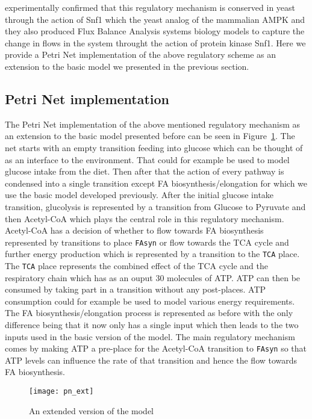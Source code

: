 \citet{nielsen2009systems} experimentally confirmed that
this regulatory mechanism is conserved in yeast through the action of
Snf1 which the yeast analog of the mammalian AMPK and they also
produced Flux Balance Analysis systems biology models to capture the
change in flows in the system throught the action of protein kinase
Snf1. Here we provide a Petri Net implementation of the above
regulatory scheme as an extension to the basic model we presented
in the previous section.

\subsection{Petri Net implementation}
The Petri Net implementation of the above mentioned regulatory
mechanism as an extension to the basic model presented before can be
seen in Figure~\ref{fig:pn_ext}. The net starts with an empty
transition feeding into glucose which can be thought of as an
interface to the environment. That could for example be used to model
glucose intake from the diet. Then after that the action of every pathway
is condensed into a single transition except FA
biosynthesis/elongation for which we use the basic model developed
previously. After the initial glucose intake transition, glucolysis is
represented by a transition from Glucose to Pyruvate and then
Acetyl-CoA which plays the central role in this regulatory
mechanism. Acetyl-CoA has a decision of whether to flow towards FA
biosynthesis represented by transitions to place \texttt{FAsyn}
or flow towards the TCA cycle and further energy production which is
represented by a transition to the \texttt{TCA}
place. The \texttt{TCA}  place represents the combined
effect of the TCA cycle and the respiratory chain which has as an
ouput 30 molecules of ATP. ATP can then be consumed by taking part in
a transition without any post-places. ATP consumption could for
example be used to model various energy requirements. The FA biosynthesis/elongation
process is represented as before with the only difference
being that it now only has a single input which then leads to the two
inputs used in the basic version of the model.
The main regulatory mechanism comes by making ATP a pre-place for the
Acetyl-CoA transition to \texttt{FAsyn} so that ATP levels can
influence the rate of that transition and hence the flow towards FA
biosynthesis.

\begin{figure}[htbp!]
\centering
\texttt{[image: pn\_ext]}
\caption[Extended Petri Net model]{An extended version of the model}
\label{fig:pn_ext}
\end{figure}


